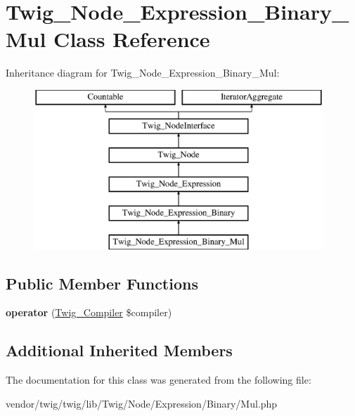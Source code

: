 \hypertarget{classTwig__Node__Expression__Binary__Mul}{}\section{Twig\+\_\+\+Node\+\_\+\+Expression\+\_\+\+Binary\+\_\+\+Mul Class Reference}
\label{classTwig__Node__Expression__Binary__Mul}
Inheritance diagram for Twig\+\_\+\+Node\+\_\+\+Expression\+\_\+\+Binary\+\_\+\+Mul\+:\begin{figure}[H]
\begin{center}
\leavevmode
\includegraphics[height=6.000000cm]{classTwig__Node__Expression__Binary__Mul}
\end{center}
\end{figure}
\subsection*{Public Member Functions}
\begin{DoxyCompactItemize}
\item 
{\bfseries operator} (\hyperlink{classTwig__Compiler}{Twig\+\_\+\+Compiler} \$compiler)\hypertarget{classTwig__Node__Expression__Binary__Mul_afbcbb2b5d14722abc26fbb3c16435eca}{}\label{classTwig__Node__Expression__Binary__Mul_afbcbb2b5d14722abc26fbb3c16435eca}

\end{DoxyCompactItemize}
\subsection*{Additional Inherited Members}


The documentation for this class was generated from the following file\+:\begin{DoxyCompactItemize}
\item 
vendor/twig/twig/lib/\+Twig/\+Node/\+Expression/\+Binary/Mul.\+php\end{DoxyCompactItemize}
